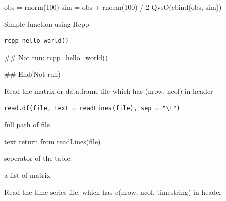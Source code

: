 \documentclass[a4paper]{book}
\begin{document}
%
\begin{Examples}
\begin{ExampleCode}
obs = rnorm(100)
sim = obs + rnorm(100) / 2
QvsO(cbind(obs, sim))
\end{ExampleCode}
\end{Examples}
%
\begin{Description}\relax
Simple function using Rcpp
\end{Description}
%
\begin{Usage}
\begin{verbatim}
rcpp_hello_world()	
\end{verbatim}
\end{Usage}
%
\begin{Examples}
\begin{ExampleCode}
## Not run: 
rcpp_hello_world()

## End(Not run)
\end{ExampleCode}
\end{Examples}
%
\begin{Description}\relax
Read the matrix or data.frame file which has (nrow, ncol) in header
\end{Description}
%
\begin{Usage}
\begin{verbatim}
read.df(file, text = readLines(file), sep = "\t")
\end{verbatim}
\end{Usage}
%
\begin{Arguments}
\begin{ldescription}
\item[\code{file}] full path of file

\item[\code{text}] text return from readLines(file)

\item[\code{sep}] seperator of the table.
\end{ldescription}
\end{Arguments}
%
\begin{Value}
a list of matrix
\end{Value}
%
\begin{Description}\relax
Read the time-series file, which has c(nrow, ncol, timestring) in header
\end{Description}
\end{document}
